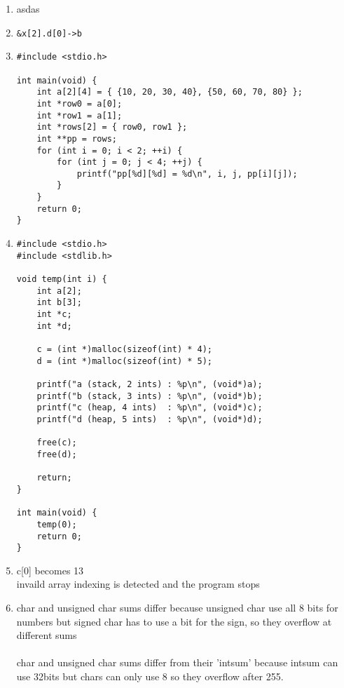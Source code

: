 \documentclass[12pt]{article}
\begin{document}
\begin{enumerate}
\begin{tabular}{|c|c|c|c|}
        \end{tabular}
        \begin{enumerate}[label=\arabic*)]
        \item asdas




        \item \texttt{\&x[2].d[0]->b}
        \item \begin{verbatim}
#include <stdio.h>

int main(void) {
    int a[2][4] = { {10, 20, 30, 40}, {50, 60, 70, 80} };
    int *row0 = a[0];
    int *row1 = a[1];
    int *rows[2] = { row0, row1 };
    int **pp = rows;
    for (int i = 0; i < 2; ++i) {
        for (int j = 0; j < 4; ++j) {
            printf("pp[%d][%d] = %d\n", i, j, pp[i][j]);
        }
    }
    return 0;
}
\end{verbatim}
        \item \begin{verbatim}
#include <stdio.h>
#include <stdlib.h>

void temp(int i) {
    int a[2];
    int b[3];
    int *c;
    int *d;

    c = (int *)malloc(sizeof(int) * 4);
    d = (int *)malloc(sizeof(int) * 5);

    printf("a (stack, 2 ints) : %p\n", (void*)a);
    printf("b (stack, 3 ints) : %p\n", (void*)b);
    printf("c (heap, 4 ints)  : %p\n", (void*)c);
    printf("d (heap, 5 ints)  : %p\n", (void*)d);

    free(c);
    free(d);

    return;
}

int main(void) {
    temp(0);
    return 0;
}

        \end{verbatim}

        \item c[0] becomes 13 \\
        invaild array indexing is detected and the program stops

        \item char and unsigned char sums differ because unsigned char use all 8 bits for numbers but signed char has to use a bit for the sign, so they overflow at different sums
        \\\\char and unsigned char sums differ from their 'intsum' because intsum can use 32bits but chars can only use 8 so they overflow after 255.


\end{enumerate}
\end{enumerate}
\end{document}
